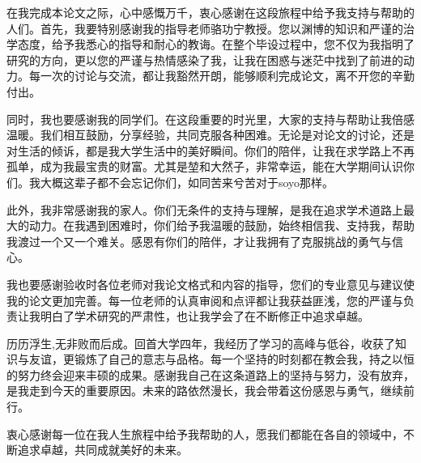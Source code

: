 \begin{acknowledgements}

在我完成本论文之际，心中感慨万千，衷心感谢在这段旅程中给予我支持与帮助的人们。首先，我要特别感谢我的指导老师骆功宁教授。您以渊博的知识和严谨的治学态度，给予我悉心的指导和耐心的教诲。在整个毕设过程中，您不仅为我指明了研究的方向，更以您的严谨与热情感染了我，让我在困惑与迷茫中找到了前进的动力。每一次的讨论与交流，都让我豁然开朗，能够顺利完成论文，离不开您的辛勤付出。

同时，我也要感谢我的同学们。在这段重要的时光里，大家的支持与帮助让我倍感温暖。我们相互鼓励，分享经验，共同克服各种困难。无论是对论文的讨论，还是对生活的倾诉，都是我大学生活中的美好瞬间。你们的陪伴，让我在求学路上不再孤单，成为我最宝贵的财富。尤其是堃和大然子，非常幸运，能在大学期间认识你们。我大概这辈子都不会忘记你们，如同苦来兮苦对于soyo那样。

此外，我非常感谢我的家人。你们无条件的支持与理解，是我在追求学术道路上最大的动力。在我遇到困难时，你们给予我温暖的鼓励，始终相信我、支持我，帮助我渡过一个又一个难关。感恩有你们的陪伴，才让我拥有了克服挑战的勇气与信心。

我也要感谢验收时各位老师对我论文格式和内容的指导，您们的专业意见与建议使我的论文更加完善。每一位老师的认真审阅和点评都让我获益匪浅，您的严谨与负责让我明白了学术研究的严肃性，也让我学会了在不断修正中追求卓越。

历历浮生,无非败而后成。回首大学四年，我经历了学习的高峰与低谷，收获了知识与友谊，更锻炼了自己的意志与品格。每一个坚持的时刻都在教会我，持之以恒的努力终会迎来丰硕的成果。感谢我自己在这条道路上的坚持与努力，没有放弃，是我走到今天的重要原因。未来的路依然漫长，我会带着这份感恩与勇气，继续前行。

衷心感谢每一位在我人生旅程中给予我帮助的人，愿我们都能在各自的领域中，不断追求卓越，共同成就美好的未来。


\end{acknowledgements}
